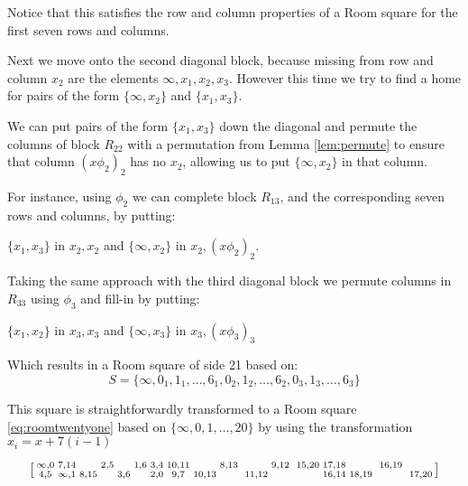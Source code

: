 \begin{example}
Notice that this satisfies the row and column properties of a Room square for the first seven rows and columns.

Next we move onto the second diagonal block, because missing from row and column $x_2$ are the elements $\infty, x_1, x_2, x_3$.
However this time we try to find a home for pairs of the form $\{\infty, x_2\}$ and $\{x_1, x_3\}$.

We can put pairs of the form $\{x_1, x_3\}$ down the diagonal and permute the columns of block $R_{22}$ with a permutation from Lemma \ref{lem:permute} to ensure that column $(x\phi _2)_2$ has no $x_2$, allowing us to put $\{\infty, x_2\}$ in that column.

For instance, using $\phi _2$ we can complete block $R_{13}$, and the corresponding seven rows and columns, by putting:

$\{x_1, x_3\}$ in $x_2, x_2$ and $\{\infty, x_2\}$ in $x_2,(x \phi _2)_2$.

Taking the same approach with the third diagonal block we permute columns in $R_{33}$ using $\phi _3$ and fill-in by putting:

$\{x_1, x_2\}$ in $x_3, x_3$ and $\{\infty, x_3\}$ in $x_3, (x \phi _3)_3$

Which results in a Room square of side 21 based on:
$$S = \{\infty, 0_1, 1_1, \ldots, 6_1, 0_2, 1_2, \ldots, 6_2, 0_3, 1_3, \ldots, 6_3\}$$

This square is straightforwardly transformed to a Room square \eqref{eq:roomtwentyone} based on $\{\infty, 0, 1, \ldots, 20\}$ by using the transformation $x_{i} = x + 7(i - 1)$

\begin{equation}
  \begin{bsmallmatrix}
    \infty,0 &   7,14   &      & 2,5 &     & 1,6 & 3,4 & 10,11 &       & 8,13 & &       & 9,12 & & 15,20 & 17,18 &       & & 16,19 & &       \\
      4,5    & \infty,1 & 8,15 &     & 3,6 &     & 2,0 &  9,7  & 10,13 &      & & 11,12 &      & &       & 16,14 & 18,19 & &       & & 17,20 \\
  \end{bsmallmatrix}
  \label{eq:roomtwentyone}
\end{equation}
\end{example}

